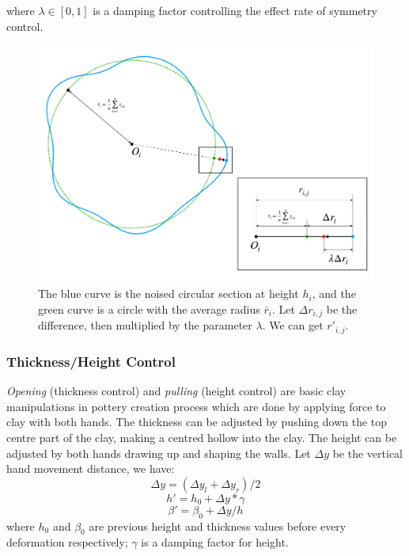 where $\lambda \in [0,1]$ is a damping factor controlling the effect rate of symmetry control.

\begin{figure}
  \includegraphics[width=\textwidth]{fig5.pdf}
\caption{The blue curve is the noised circular section at height $h_{i}$, and the green curve is a circle with the average radius $\bar r_{i}$. Let $\Delta r_{i,j}$ be the difference, then multiplied by the parameter $\lambda$. We can get $r'_{i, j}$.}
\label{fig:5}       %
\end{figure}

\subsubsection{Thickness/Height Control}
\label{sec:4.2.2}
\textit{Opening} (thickness control) and \textit{pulling} (height control) are basic clay manipulations in pottery creation process which are done by applying force to clay with both hands. The thickness can be adjusted by pushing down the top centre part of the clay, making a centred hollow into the clay. The height can be adjusted by both hands drawing up and shaping the walls.
 Let $\Delta y$ be the vertical hand movement distance, we have:
\begin{equation}
\Delta y = (\Delta y_{l} + \Delta y_{r})/2
\end{equation}
\begin{equation}
h' = h_{0} + \Delta y * \gamma
\end{equation}
\begin{equation}
\beta' = \beta_{0} + \Delta y/ h
\end{equation}
where $h_{0}$ and $\beta_{0}$ are previous height and thickness values before every deformation respectively; $\gamma$ is a damping factor for height.

